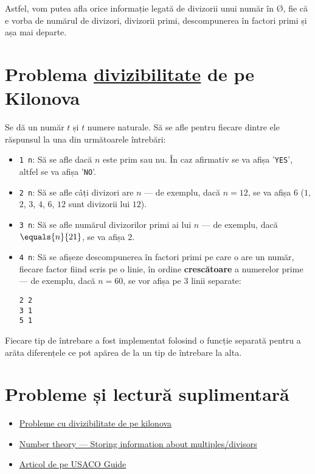 Astfel, vom putea afla orice informație legată de divizorii unui număr în \O{}, fie că e vorba de numărul de divizori, divizorii primi, descompunerea în factori primi și așa mai departe.


\section{Problema \href{https://kilonova.ro/problems/1981}{divizibilitate} de pe Kilonova}

Se dă un număr $t$ și $t$ numere naturale. Să se afle pentru fiecare dintre ele răspunsul la una din următoarele întrebări:

\begin{itemize}
\item \texttt{1 n}: Să se afle dacă $n$ este prim sau nu. În caz afirmativ se va afișa '\texttt{YES}', altfel se va afișa '\texttt{NO}'.
\item \texttt{2 n}: Să se afle câți divizori are $n$ --- de exemplu, dacă $n = 12$, se va afișa $6$ ($1$, $2$, $3$, $4$, $6$, $12$ sunt divizorii lui $12$).
\item \texttt{3 n}: Să se afle numărul divizorilor primi ai lui $n$ --- de exemplu, dacă $\equals{n}{21}$, se va afișa $2$.
\item \texttt{4 n}: Să se afișeze descompunerea în factori primi pe care o are un număr, fiecare factor fiind scris pe o linie, în ordine \textbf{crescătoare} a numerelor prime --- de exemplu, dacă $n = 60$, se vor afișa pe $3$ linii separate:
\begin{verbatim}
2 2
3 1
5 1
\end{verbatim}
\end{itemize}

Fiecare tip de întrebare a fost implementat folosind o funcție separată pentru a arăta diferențele ce pot apărea de la un tip de întrebare la alta.


\section{Probleme și lectură suplimentară}

\begin{itemize}
\item \href{https://kilonova.ro/tags/359}{Probleme cu divizibilitate de pe kilonova}
\item \href{https://codeforces.com/blog/entry/91707}{Number theory — Storing information about multiples/divisors}
\item \href{https://usaco.guide/gold/divisibility?lang=cpp}{Articol de pe USACO Guide}

\end{itemize}
